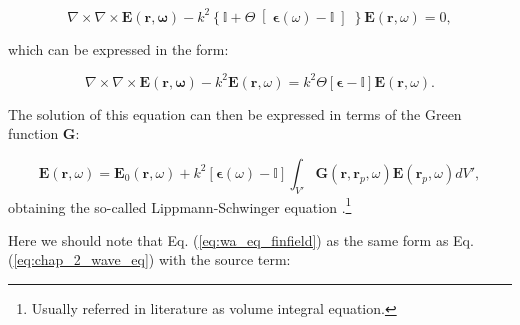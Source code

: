 \begin{equation}
\nabla \times \nabla \times \mathbf{E}\left(\mathbf{r,\omega}\right) - k^2 \left\{ \mathbb{I} + \Theta \right[\boldsymbol{\epsilon}\left(\omega\right) - \mathbb{I}\left]\right\}\mathbf{E}\left(\mathbf{r}, \omega\right) = 0,\label{eq:wa_eq_incfield}
\end{equation}

which can be expressed in the form:


\begin{equation}
\nabla \times \nabla \times \mathbf{E}\left(\mathbf{r,\omega}\right) - k^2 \mathbf{E}\left(\mathbf{r}, \omega\right) = k^2\Theta\left[\boldsymbol{\epsilon}-\mathbb{I}\right]\mathbf{E}\left(\mathbf{r},\omega\right).\label{eq:wa_eq_finfield}
\end{equation}

The solution of this equation can then be expressed in terms of the Green function $\mathbf{G}$:

%
%

\begin{equation}
\mathbf{E}\left(\mathbf{r},\omega\right) =  \mathbf{E}_{0}\left(\mathbf{r},\omega\right) + k^{2}\left[\boldsymbol{\epsilon}\left(\omega\right) -\mathbb{I}\right] \int_{V'}{\mathbf{G}\left(\mathbf{r},\mathbf{r}_{p},\omega\right)}\mathbf{E}\left(\mathbf{r}_p,\omega\right)dV', \label{eq:lipschw}
\end{equation}
obtaining the so-called Lippmann-Schwinger equation \cite{Martin_1994}.\footnote{Usually referred in literature as volume integral equation.}

Here we should note that Eq. (\ref{eq:wa_eq_finfield}) as the same form as Eq. (\ref{eq:chap_2_wave_eq}) with the source term:

